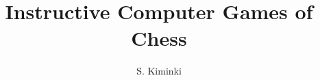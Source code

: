 \documentclass[a4paper,11pt,twocolumn]{article}
\begin{document}
\author{S. Kiminki}
\title{Instructive Computer Games of Chess}

\newcommand{\chessgame}[5]{%
  \title{%
    \Large{\emph{Instructive Computer Games of Chess:}}\\[3mm]%
    \textsf{#1 -- #2}\\%
    \Large{\printdate{#5}}\\[5mm]%
    \Large{#3}\\%
    \large{\textsc{#4}}%
  }%
  \maketitle%
  \styleC\newgame%
}

\newcommand{\chessgameappendix}[0]{\section*{Appendix}}
\end{document}
